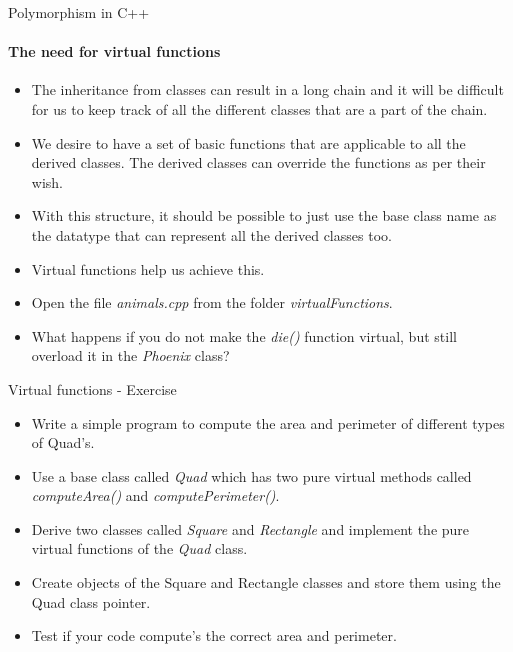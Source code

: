 \documentclass[aspectratio=169]{beamer}
\begin{document}
\begin{frame}[fragile]{Polymorphism in C++}
    \framesubtitle{The need for virtual functions}
    \begin{itemize}
        \item The inheritance from classes can result in a long chain and it will be difficult for us to keep track of all the different classes that are a part of the chain.
        \item We desire to have a set of basic functions that are applicable to all the derived classes. The derived classes can override the functions as per their wish.
        \item With this structure, it should be possible to just use the base class name as the datatype that can represent all the derived classes too.
        \item Virtual functions help us achieve this.
        \item Open the file \textit{animals.cpp} from the folder \textit{virtualFunctions}.
        \item What happens if you do not make the \textit{die()} function virtual, but still overload it in the \textit{Phoenix} class?
    \end{itemize}
\end{frame}

\begin{frame}[fragile]{Virtual functions - Exercise}
    \begin{itemize}
        \item Write a simple program to compute the area and perimeter of different types of Quad's.
        \item Use a base class called \textit{Quad} which has two pure virtual methods called \textit{computeArea()} and \textit{computePerimeter()}.
        \item Derive two classes called \textit{Square} and \textit{Rectangle} and implement the pure virtual functions of the \textit{Quad} class.
        \item Create objects of the Square and Rectangle classes and store them using the Quad class pointer.
        \item Test if your code compute's the correct area and perimeter.
    \end{itemize}
\end{frame}
\end{document}
